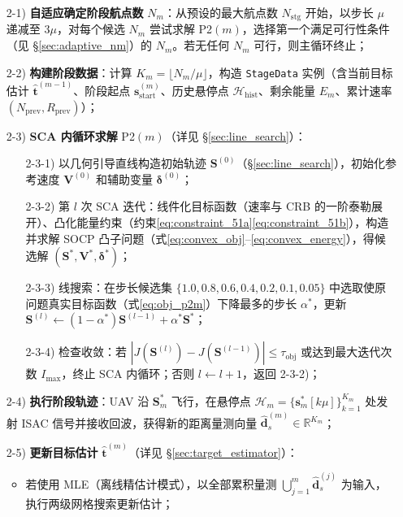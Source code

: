 \begin{enumerate}
    \item[2-1)] \textbf{自适应确定阶段航点数} $N_m$：从预设的最大航点数 $N_{\mathrm{stg}}$ 开始，以步长 $\mu$ 递减至 $3\mu$，对每个候选 $N_m$ 尝试求解 P2$(m)$，选择第一个满足可行性条件（见 \S\ref{sec:adaptive_nm}）的 $N_m$。若无任何 $N_m$ 可行，则主循环终止；
    \item[2-2)] \textbf{构建阶段数据}：计算 $K_m=\lfloor N_m/\mu\rfloor$，构造 \texttt{StageData} 实例（含当前目标估计 $\hat{\mathbf{t}}^{(m-1)}$、阶段起点 $\mathbf{s}_{\mathrm{start}}^{(m)}$、历史悬停点 $\mathcal{H}_{\mathrm{hist}}$、剩余能量 $E_m$、累计速率 $(N_{\mathrm{prev}},R_{\mathrm{prev}})$）；
    \item[2-3)] \textbf{SCA 内循环求解} P2$(m)$（详见 \S\ref{sec:line_search}）：
        \begin{itemize}
            \item[2-3-1)] 以几何引导直线构造初始轨迹 $\mathbf{S}^{(0)}$（\S\ref{sec:line_search}），初始化参考速度 $\mathbf{V}^{(0)}$ 和辅助变量 $\bm{\delta}^{(0)}$；
            \item[2-3-2)] 第 $l$ 次 SCA 迭代：线件化目标函数（速率与 CRB 的一阶泰勒展开）、凸化能量约束（约束\eqref{eq:constraint_51a}\eqref{eq:constraint_51b}），构造并求解 SOCP 凸子问题（式\eqref{eq:convex_obj}--\eqref{eq:convex_energy}），得候选解 $(\mathbf{S}^*,\mathbf{V}^*,\bm{\delta}^*)$；
            \item[2-3-3)] 线搜索：在步长候选集 $\{1.0,0.8,0.6,0.4,0.2,0.1,0.05\}$ 中选取使原问题真实目标函数（式\eqref{eq:obj_p2m}）下降最多的步长 $\alpha^*$，更新 $\mathbf{S}^{(l)}\leftarrow(1-\alpha^*)\mathbf{S}^{(l-1)}+\alpha^*\mathbf{S}^*$；
            \item[2-3-4)] 检查收敛：若 $|J(\mathbf{S}^{(l)})-J(\mathbf{S}^{(l-1)})|\leq\tau_{\mathrm{obj}}$ 或达到最大迭代次数 $I_{\max}$，终止 SCA 内循环；否则 $l\leftarrow l+1$，返回 2-3-2)；
        \end{itemize}
    \item[2-4)] \textbf{执行阶段轨迹}：UAV 沿 $\mathbf{S}_m^*$ 飞行，在悬停点 $\mathcal{H}_m=\{\mathbf{s}_m^*[k\mu]\}_{k=1}^{K_m}$ 处发射 ISAC 信号并接收回波，获得新的距离量测向量 $\widehat{\mathbf{d}}_s^{(m)}\in\mathbb{R}^{K_m}$；
    \item[2-5)] \textbf{更新目标估计} $\hat{\mathbf{t}}^{(m)}$（详见 \S\ref{sec:target_estimator}）：
        \begin{itemize}
            \item 若使用 MLE（离线精估计模式），以全部累积量测 $\bigcup_{j=1}^{m}\widehat{\mathbf{d}}_s^{(j)}$ 为输入，执行两级网格搜索更新估计；

\end{itemize}
\end{enumerate}
